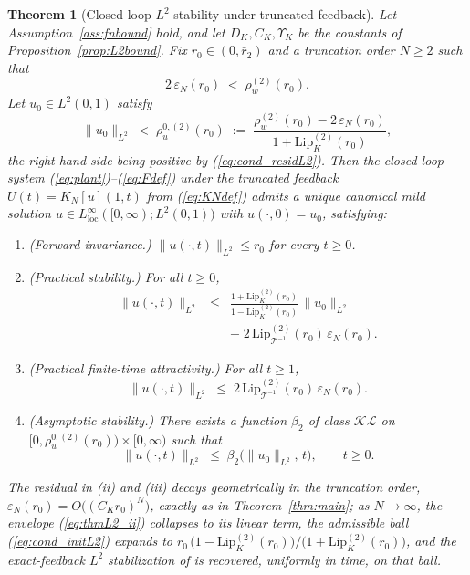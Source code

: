 \documentclass[10pt,a4paper]{amsart}
\newtheorem{theorem}{Theorem}
\newcommand{\Tcal}{\mathcal{T}}
\newcommand{\Linf}{L^\infty}
\newcommand{\Ltwo}{L^2}
\newcommand{\Lipk}{\mathrm{Lip}_K}
\newcommand{\LipT}{\mathrm{Lip}_{\Tcal^{-1}}}
\newcommand{\eps}{\varepsilon}
\begin{document}
\begin{theorem}[Closed-loop $\Ltwo$ stability under truncated feedback]\label{thm:L2}
Let Assumption~\ref{ass:fnbound} hold, and let $D_K, C_K, \Upsilon_K$ be the constants of Proposition~\ref{prop:L2bound}. Fix $r_0 \in (0, \bar r_2)$ and a truncation order $N \ge 2$ such that
\begin{equation}
2\,\eps_N(r_0) \;<\; \rho_w^{(2)}(r_0).
\label{eq:cond_residL2}
\end{equation}
Let $u_0 \in \Ltwo(0,1)$ satisfy
\begin{equation}
\|u_0\|_{\Ltwo} \;<\; \rho_u^{0,(2)}(r_0) \;:=\; \frac{\rho_w^{(2)}(r_0) - 2\,\eps_N(r_0)}{1 + \Lipk^{(2)}(r_0)},
\label{eq:cond_initL2}
\end{equation}
the right-hand side being positive by (\ref{eq:cond_residL2}). Then the closed-loop system (\ref{eq:plant})--(\ref{eq:Fdef}) under the truncated feedback $U(t) = K_N[u](1,t)$ from (\ref{eq:KNdef}) admits a unique canonical mild solution $u \in \Linf_{\mathrm{loc}}([0,\infty); \Ltwo(0,1))$ with $u(\cdot,0) = u_0$, satisfying:
\begin{enumerate}[label=(\roman*)]
\item \emph{(Forward invariance.)} $\|u(\cdot,t)\|_{\Ltwo} \le r_0$ for every $t \ge 0$.
\item \emph{(Practical stability.)} For all $t \ge 0$,
\begin{eqnarray}
\|u(\cdot,t)\|_{\Ltwo} &\le& \frac{1 + \Lipk^{(2)}(r_0)}{1 - \Lipk^{(2)}(r_0)}\,\|u_0\|_{\Ltwo} \nonumber \\
&& +\; 2\,\LipT^{(2)}(r_0)\,\eps_N(r_0).
\label{eq:thmL2_ii}
\end{eqnarray}
\item \emph{(Practical finite-time attractivity.)} For all $t \ge 1$,
\begin{equation}
\|u(\cdot,t)\|_{\Ltwo} \;\le\; 2\,\LipT^{(2)}(r_0)\,\eps_N(r_0).
\label{eq:thmL2_iii}
\end{equation}
\item \emph{(Asymptotic stability.)} There exists a function $\beta_2$ of class $\mathcal{KL}$ on $[0, \rho_u^{0,(2)}(r_0)) \times [0,\infty)$ such that
\begin{equation}
\|u(\cdot,t)\|_{\Ltwo} \;\le\; \beta_2\bigl(\|u_0\|_{\Ltwo},\, t\bigr), \qquad t \ge 0.
\label{eq:thmL2_iv}
\end{equation}
\end{enumerate}
The residual in (ii) and (iii) decays geometrically in the truncation order, $\eps_N(r_0) = O\bigl((C_K r_0)^N\bigr)$, exactly as in Theorem~\ref{thm:main}; as $N \to \infty$, the envelope (\ref{eq:thmL2_ii}) collapses to its linear term, the admissible ball (\ref{eq:cond_initL2}) expands to $r_0\,\bigl(1 - \Lipk^{(2)}(r_0)\bigr)/\bigl(1 + \Lipk^{(2)}(r_0)\bigr)$, and the exact-feedback $\Ltwo$ stabilization of \cite{krstic2026feedbacklinearizationhyperbolicpdes} is recovered, uniformly in time, on that ball.
\end{theorem}
\end{document}
